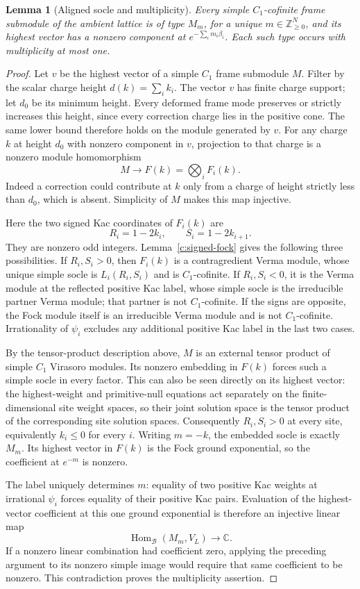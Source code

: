 \documentclass[11pt,a4paper]{article}
\numberwithin{equation}{section}
\newtheorem{lemma}[theorem]{Lemma}
\theoremstyle{definition}\newtheorem{definition}[theorem]{Definition}
\theoremstyle{remark}\newtheorem{remark}[theorem]{Remark}
\begin{document}
\begin{lemma}[Aligned socle and multiplicity]\label{c:aligned-C1-socle}
Every simple $C_1$-cofinite frame submodule of the ambient lattice is
of type $M_m$, for a unique $m\in\mathbb Z_{\geq0}^N$, and its
highest vector has a nonzero component at $e^{-\sum_i m_i\beta_i}$.
Each such type occurs with multiplicity at most one.
\end{lemma}
\begin{proof}
Let $v$ be the highest vector of a simple $C_1$ frame submodule $M$.
Filter by the scalar charge height $d(k)=\sum_i k_i$.
The vector $v$ has finite charge support; let $d_0$ be its minimum
height.  Every deformed frame mode preserves or strictly increases
this height, since every correction charge lies in the positive
cone.  The same lower bound therefore holds on the module generated
by $v$.  For any charge $k$ at height $d_0$ with nonzero component in
$v$, projection to that charge is a nonzero module homomorphism
\[
 M\longrightarrow F(k)=\bigotimes_iF_i(k).
\]
Indeed a correction could contribute at $k$ only from a charge of
height strictly less than $d_0$, which is absent.  Simplicity of $M$
makes this map injective.

Here the two signed Kac coordinates of $F_i(k)$ are
\[
 R_i=1-2k_i,\qquad S_i=1-2k_{i+1}.
\]
They are nonzero odd integers.  Lemma~\ref{c:signed-fock} gives the following three possibilities.  If
$R_i,S_i>0$, then $F_i(k)$ is a contragredient Verma module, whose
unique simple socle is $L_i(R_i,S_i)$ and is $C_1$-cofinite.  If
$R_i,S_i<0$, it is the Verma module at the reflected positive Kac
label, whose simple socle is the irreducible partner Verma module;
that partner is not $C_1$-cofinite.  If the signs are opposite, the
Fock module itself is an irreducible Verma module and is not
$C_1$-cofinite.  Irrationality of $\psi_i$ excludes any additional
positive Kac label in the last two cases.

By the tensor-product description above, $M$ is an external tensor
product of simple $C_1$ Virasoro modules.  Its nonzero embedding in
$F(k)$ forces such a simple socle in every factor.  This can also be
seen directly on its highest vector: the highest-weight and
primitive-null equations act separately on the finite-dimensional
site weight spaces, so their joint solution space is the tensor
product of the corresponding site solution spaces.  Consequently
$R_i,S_i>0$ at every site, equivalently $k_i\leq0$ for every $i$.
Writing $m=-k$, the embedded socle is exactly $M_m$.  Its highest
vector in $F(k)$ is the Fock ground exponential, so the coefficient
at $e^{-m}$ is nonzero.

The label uniquely determines $m$: equality of two positive Kac
weights at irrational $\psi_i$ forces equality of their positive
Kac pairs.  Evaluation of the highest-vector coefficient at this
one ground exponential is therefore an injective linear map
\[
 \operatorname{Hom}_{\mathcal B}(M_m,V_L)\longrightarrow\mathbb C.
\]
If a nonzero linear combination had coefficient zero, applying the
preceding argument to its nonzero simple image would require that
same coefficient to be nonzero.  This contradiction proves the
multiplicity assertion.
\end{proof}
\end{document}
